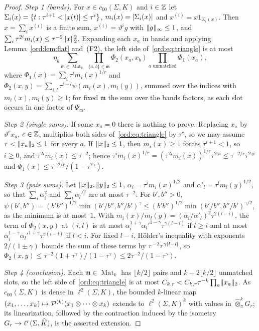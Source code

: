 \begin{proof}
\emph{Step 1 (bands).} For $x\in c_{00}(\Sigma,K)$ and $i\in\mathbb Z$ let $\Sigma_i(x)=\{t:\tau^{i+1}<\lvert x(t)\rvert\le\tau^i\}$,
$m_i(x)=\lvert \Sigma_i(x)\rvert$ and $x^{(i)}=x1_{\Sigma_i(x)}$. Then $x=\sum_ix^{(i)}$ is a finite sum,
$x^{(i)}=\vartheta^ig$ with $\lVert g\rVert_\infty\le1$, and $\sum_i\tau^{2i}m_i(x)\le\tau^{-2}\lVert x\rVert_2^2$. Expanding each $x_a$
in bands and applying Lemma~\ref{ord:lem:flat} and~(F2), the left side of~\eqref{ord:eq:triangle} is at most
\[
 \eta_k\sum_{\mathfrak m\in\operatorname{Mat}_k}\,\prod_{\{a,b\}\in\mathfrak m}\Phi_2(x_a,x_b)\prod_{a\text{ unmatched}}\Phi_1(x_a),
\]
where $\Phi_1(x)=\sum_i\tau^im_i(x)^{1/r}$ and $\Phi_2(x,y)=\sum_{i,l}\tau^{i+l}\psi(m_i(x),m_l(y))$, summed over the
indices with $m_i(x),m_l(y)\ge1$; for fixed $\mathfrak m$ the sum over the bands factors, as each slot occurs in one
factor of $\Psi_{\mathfrak m}$.

\emph{Step 2 (single sums).} If some $x_a=0$ there is nothing to prove. Replacing $x_a$ by $\vartheta^cx_a$, $c\in\mathbb Z$,
multiplies both sides of~\eqref{ord:eq:triangle} by $\tau^c$, so we may assume $\tau<\lVert x_a\rVert_2\le1$ for every $a$.
If $\lVert x\rVert_2\le1$, then $m_i(x)\ge1$ forces $\tau^{i+1}<1$, so $i\ge0$, and $\tau^{2i}m_i(x)\le\tau^{-2}$; hence
$\tau^im_i(x)^{1/r}=(\tau^{2i}m_i(x))^{1/r}\tau^{2\gamma i}\le\tau^{-2/r}\tau^{2\gamma i}$ and
$\Phi_1(x)\le\tau^{-2/r}/(1-\tau^{2\gamma})$.

\emph{Step 3 (pair sums).} Let $\lVert x\rVert_2,\lVert y\rVert_2\le1$, $\alpha_i=\tau^im_i(x)^{1/2}$ and $\alpha'_l=\tau^lm_l(y)^{1/2}$,
so that $\sum_i\alpha_i^2$ and $\sum_l\alpha_l'^2$ are at most $\tau^{-2}$. For $b',b''>0$,
$\psi(b',b'')=(b'b'')^{1/2}\min(b'/b'',b''/b')^\gamma\le(b'b'')^{1/2}\min(b'/b'',b''/b')^{\gamma/2}$, as the minimum is
at most~$1$. With $m_i(x)/m_l(y)=(\alpha_i/\alpha'_l)^2\tau^{2(l-i)}$, the term of $\Phi_2(x,y)$ at $(i,l)$ is at most
$\alpha_i^{1+\gamma}\alpha_l'^{1-\gamma}\tau^{\gamma(l-i)}$ if $l\ge i$ and at most
$\alpha_i^{1-\gamma}\alpha_l'^{1+\gamma}\tau^{\gamma(i-l)}$ if $l<i$. For fixed $l-i$, H\"older's inequality with
exponents $2/(1\pm\gamma)$ bounds the sum of these terms by $\tau^{-2}\tau^{\gamma\lvert l-i\rvert}$, so
$\Phi_2(x,y)\le\tau^{-2}(1+\tau^\gamma)/(1-\tau^\gamma)\le2\tau^{-2}/(1-\tau^\gamma)$.

\emph{Step 4 (conclusion).} Each $\mathfrak m\in\operatorname{Mat}_k$ has $\lfloor k/2\rfloor$ pairs and
$k-2\lfloor k/2\rfloor$ unmatched slots, so the left side of~\eqref{ord:eq:triangle} is at most
$C_{k,r}<C_{k,r}\tau^{-k}\prod_a\lVert x_a\rVert_2$. As $c_{00}(\Sigma,K)$ is dense in $\ell^2(\Sigma,K)$, the bounded
$k$\nobreakdash-linear map $(x_1,\dots,x_k)\mapsto\mathcal P^{(k)}(x_1\otimes\dots\otimes x_k)$ extends to $\ell^2(\Sigma,K)^k$
with values in $\widehat\otimes^k_\pi G_r$; its linearization, followed by the contraction induced by the isometry
$G_r\to\ell^r(\Sigma,\widehat K)$, is the asserted extension.
\end{proof}

